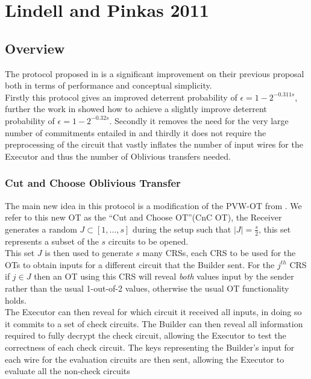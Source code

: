 \documentclass[ %
                    author={Nicholas Tutte},
                supervisor={Prof. Nigel Smart},
                    degree={MEng},
                     title={Secure Two Party Computation},
                  subtitle={A practical comparison of recent protocols},
                      type={Research - GG1K},
                      year={2015} ]{dissertation}
\begin{document}
		\section{Lindell and Pinkas 2011}
			\subsection*{Overview}
				The protocol proposed in \cite{LindellAndPinkas2011} is a significant improvement on their previous proposal \cite{LindellAndPinkas2007} both in terms of performance and conceptual simplicity.\\

				Firstly this protocol gives an improved deterrent probability of $\epsilon = 1 - 2^{-0.311s}$, further the work in \cite{ShelatAndShen} showed how to achieve a slightly improve deterrent probability of $\epsilon = 1 - 2^{-0.32s}$. Secondly it removes the need for the very large number of commitments entailed in \cite{LindellAndPinkas2007} and thirdly it does not require the preprocessing of the circuit that vastly inflates the number of input wires for the Executor and thus the number of Oblivious transfers needed.

				\subsubsection{Cut and Choose Oblivious Transfer}
					The main new idea in this protocol is a modification of the PVW-OT from \cite{PVW_OT_2008}. We refer to this new OT as the ``Cut and Choose OT''(CnC OT), the Receiver generates a random $J \subset [1, ..., s]$ during the setup such that $\vert J \vert = \frac{s}{2}$, this set represents a subset of the $s$ circuits to be opened.\\

					This set $J$ is then used to generate $s$ many CRSs, each CRS to be used for the OTs to obtain inputs for a different circuit that the Builder sent. For the $j^{th}$ CRS if $j \in J$ then an OT using this CRS will reveal \emph{both} values input by the sender rather than the usual 1-out-of-2 values, otherwise the usual OT functionality holds.\\

					The Executor can then reveal for which circuit it received all inputs, in doing so it commits to a set of check circuits. The Builder can then reveal all information required to fully decrypt the check circuit, allowing the Executor to test the correctness of each check circuit. The keys representing the Builder's input for each wire for the evaluation circuits are then sent, allowing the Executor to evaluate all the non-check circuits\\
\end{document}
